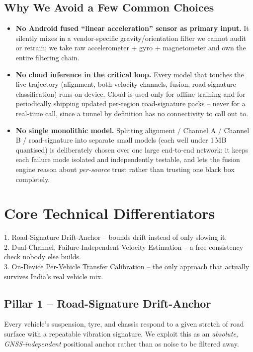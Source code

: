 \documentclass[10.5pt]{article}
\begin{document}
\subsection{Why We Avoid a Few Common Choices}
\begin{itemize}
\item \textbf{No Android fused ``linear acceleration'' sensor as primary input.} It silently mixes in a vendor-specific gravity/orientation filter we cannot audit or retrain; we take raw accelerometer + gyro + magnetometer and own the entire filtering chain.
\item \textbf{No cloud inference in the critical loop.} Every model that touches the live trajectory (alignment, both velocity channels, fusion, road-signature classification) runs on-device. Cloud is used only for offline training and for periodically shipping updated per-region road-signature packs -- never for a real-time call, since a tunnel by definition has no connectivity to call out to.
\item \textbf{No single monolithic model.} Splitting alignment / Channel A / Channel B / road-signature into separate small models (each well under 1\,MB quantised) is deliberately chosen over one large end-to-end network: it keeps each failure mode isolated and independently testable, and lets the fusion engine reason about \emph{per-source} trust rather than trusting one black box completely.
\end{itemize}

\newpage
\section{Core Technical Differentiators}

\begin{diffbox}
1. Road-Signature Drift-Anchor -- bounds drift instead of only slowing it. \\
2. Dual-Channel, Failure-Independent Velocity Estimation -- a free consistency check nobody else builds. \\
3. On-Device Per-Vehicle Transfer Calibration -- the only approach that actually survives India's real vehicle mix.
\end{diffbox}

\subsection{Pillar 1 -- Road-Signature Drift-Anchor}
Every vehicle's suspension, tyre, and chassis respond to a given stretch of road surface with a repeatable vibration signature. We exploit this as an \emph{absolute, GNSS-independent} positional anchor rather than as noise to be filtered away.
\end{document}
